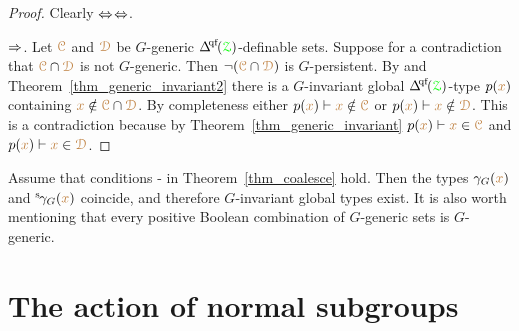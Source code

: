 \begin{proof}
  Clearly $\Leftrightarrow$$\Leftrightarrow$.

  $\Rightarrow$.
  Let ${\color{brown}\EuScript C}$ and ${\color{brown}\EuScript D}$ be $G$-generic $\qfDelta({\grZ})$-definable sets.
  Suppose for a contradiction that ${\color{brown}\EuScript C}\cap{\color{brown}\EuScript D}$ is not $G$-generic.
  Then $\neg({\color{brown}\EuScript C}\cap{\color{brown}\EuScript D})$ is $G$-persistent.
  By  and Theorem~\ref{thm_generic_invariant2} there is a $G$-invariant global $\qfDelta({\grZ})$-type $p({\color{brown} x})$ containing ${\color{brown} x}\notin{\color{brown}\EuScript C}\cap{\color{brown}\EuScript D}$.
  By completeness either $p({\color{brown} x})\vdash{\color{brown}x}\notin{\color{brown}\EuScript C}$ or $p({\color{brown} x})\vdash{\color{brown}x}\notin{\color{brown}\EuScript D}$.
  This is a contradiction because by Theorem~\ref{thm_generic_invariant} $p({\color{brown} x})\vdash{\color{brown}x}\in{\color{brown}\EuScript C}$ and $p({\color{brown} x})\vdash{\color{brown}x}\in{\color{brown}\EuScript D}$.
\end{proof}


\begin{remark}\label{rem_coalesce} 
  Assume that conditions - in Theorem~\ref{thm_coalesce} hold.
  Then the types $\gamma_G({\color{brown} x})$ and ${}^{\rm s}\kern-.2ex\gamma_G({\color{brown} x})$ coincide, and therefore $G$-invariant global types exist.
  It is also worth mentioning that every positive Boolean combination of $G$-generic sets is $G$-generic.
\end{remark}

\section{The action of normal subgroups}\label{normalsubgroups}

